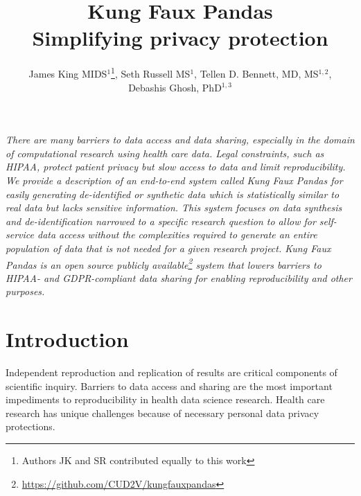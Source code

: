 \documentclass{amia}
\begin{document}
\title{%
  Kung Faux Pandas \\
  \large Simplifying privacy protection
  }

\author{
  James King MIDS$^{1}$\footnote{Authors JK and SR contributed equally to this work\label{contribution}},
  Seth Russell MS$^{1}$,
  Tellen D. Bennett, MD, MS$^{1,2}$,\\
  Debashis Ghosh, PhD$^{1,3}$
  }
  

\maketitle


\textit{There are many barriers to data access and data sharing, especially in the domain of computational research using health care data. Legal constraints, such as HIPAA, protect patient privacy but slow access to data and limit reproducibility. We provide a description of an end-to-end system called \emph{Kung Faux Pandas} for easily generating de-identified or synthetic data which is statistically similar to real data but lacks sensitive information. This system focuses on data synthesis and de-identification narrowed to a specific research question to allow for self-service data access without the complexities required to generate an entire population of data that is not needed for a given research project. Kung Faux Pandas is an open source publicly available\footnote{\url{https://github.com/CUD2V/kungfauxpandas}} system that lowers barriers to HIPAA- and GDPR-compliant data sharing for enabling reproducibility and other purposes.}

\section{Introduction}

Independent reproduction and replication of results are critical components of scientific inquiry. Barriers to data access and sharing are the most important impediments to reproducibility in health data science research. Health care research has unique challenges because of necessary personal data privacy protections.
\end{document}
